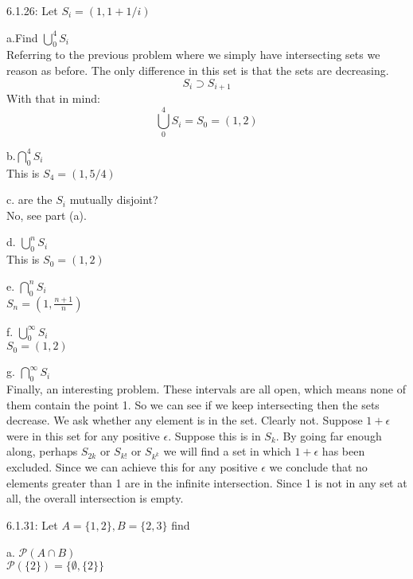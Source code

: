 \documentclass[16 pt]{amsart}
\theoremstyle{definition}
\theoremstyle{remark}
\numberwithin{equation}{section}
\begin{document}
6.1.26:  Let $S_i = (1,1+1/i)$

a.Find $\bigcup_{0}^{4}S_i$\\
Referring to the previous problem where we simply have intersecting sets we reason as before.  The only difference in this set is that the sets are decreasing.
\[
S_i \supset S_{i+1}
\]
With that in mind:
\[
\bigcup_{0}^{4}S_i = S_0 = (1,2)
\]

\vspace{.5in}

b.$\bigcap_{0}^{4}S_i$\\
This is $S_4 = (1,5/4)$

\vspace{.5in}

c. are the $S_i$ mutually disjoint?\\
No, see part (a).

\vspace{.5in}



d. $\bigcup_{0}^{n}S_i$\\
This is $S_0 = (1,2)$

\vspace{.5in}

e. $\bigcap_{0}^{n}S_i$\\
$S_n = (1,\frac{n+1}{n})$

\vspace{.5in}

f. $\bigcup_{0}^{\infty}S_i$\\
$S_0=(1,2)$

\vspace{.5in}

g. $\bigcap_{0}^{\infty}S_i$\\
Finally, an interesting problem.  These intervals are all open, which means none of them contain the point 1.  So we can see if we keep intersecting then the sets decrease. We ask whether any element is in the set.  Clearly not.  Suppose $1+\epsilon$ were in this set for any positive $\epsilon$.  Suppose this is in $S_k$.  By going far enough along, perhaps $S_{2k}$ or $S_{k!}$ or $S_{k^k}$ we will find a set in which $1+\epsilon$ has been excluded.  Since we can achieve this for any positive $\epsilon$ we conclude that no elements greater than 1 are in the infinite intersection.  Since 1 is not in any set at all, the overall intersection is empty.

\newpage

6.1.31: Let $A=\{1,2\}, B=\{2,3\}$ find 

a. $\mathcal{P}(A\cap B)$\\
$\mathcal{P}(\{2\}) = \{\emptyset, \{2\}\}$
\end{document}
